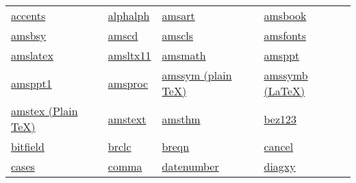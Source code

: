 \begin{table}[htb]
\begin{center}
\noindent
\begin{tabular}{llll}
\href{http://www.dante.de/CTAN/help/Catalogue/entries/accents.html}{accents}&
\href{http://www.dante.de/CTAN/help/Catalogue/entries/alphalph.html}{alphalph}&
\href{http://www.dante.de/CTAN/help/Catalogue/entries/amsart.html}{amsart}&
\href{http://www.dante.de/CTAN/help/Catalogue/entries/amsbook.html}{amsbook}\\
\href{http://www.dante.de/CTAN//help/Catalogue/entries/amsbsy.html}{amsbsy}&
\href{http://www.dante.de/CTAN//help/Catalogue/entries/amscd.html}{amscd}&
\href{http://www.dante.de/CTAN//help/Catalogue/entries/amscls.html}{amscls}&
\href{http://www.dante.de/CTAN//help/Catalogue/entries/amsfonts.html}{amsfonts}\\
\href{http://www.dante.de/CTAN//help/Catalogue/entries/amslatex.html}{amslatex}&
\href{http://www.dante.de/CTAN//help/Catalogue/entries/amsltx11.html}{amsltx11}&
\href{http://www.dante.de/CTAN//help/Catalogue/entries/amsmath.html}{amsmath}&
\href{http://www.dante.de/CTAN//help/Catalogue/entries/amsppt.html}{amsppt}\\
\href{http://www.dante.de/CTAN//help/Catalogue/entries/amsppt1.html}{amsppt1}&
\href{http://www.dante.de/CTAN//help/Catalogue/entries/amsproc.html}{amsproc}&
\href{http://www.dante.de/CTAN//help/Catalogue/entries/amssym.html}{amssym (plain TeX)}&
\href{http://www.dante.de/CTAN//help/Catalogue/entries/amssymb.html}{amssymb (LaTeX)}\\
\href{http://www.dante.de/CTAN//help/Catalogue/entries/amstex.html}{amstex (Plain TeX)}&
\href{http://www.dante.de/CTAN//help/Catalogue/entries/amstext.html}{amstext}&
\href{http://www.dante.de/CTAN//help/Catalogue/entries/amsthm.html}{amsthm}&
\href{http://www.dante.de/CTAN//help/Catalogue/entries/bez123.html}{bez123}\\
\href{http://www.dante.de/CTAN//help/Catalogue/entries/bitfield.html}{bitfield}&
\href{http://www.dante.de/CTAN//help/Catalogue/entries/brclc.html}{brclc}&
\href{http://www.dante.de/CTAN//help/Catalogue/entries/breqn.html}{breqn}&
\href{http://www.dante.de/CTAN//help/Catalogue/entries/cancel.html}{cancel}\\
\href{http://www.dante.de/CTAN//help/Catalogue/entries/cases.html}{cases}&
\href{http://www.dante.de/CTAN//help/Catalogue/entries/comma.html}{comma}&
\href{http://www.dante.de/CTAN//help/Catalogue/entries/datenumber.html}{datenumber}&
\href{http://www.dante.de/CTAN//help/Catalogue/entries/diagxy.html}{diagxy}\\

\end{tabular}
\end{center}
\end{table}
